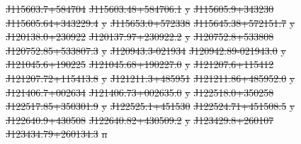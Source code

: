 \documentclass[11pt, a4paper]{book}
\providecommand{\DIFdeltex}[1]{{\protect\color{red}\sout{#1}}}                      %
\providecommand{\DIFdelFL}[1]{\DIFdel{#1}} %
\providecommand{\DIFdel}[1]{\texorpdfstring{\DIFdeltex{#1}}{}} %
\begin{document}
\DIFdelFL{J115603.7+584704 }%
\DIFdelFL{J115603.48+584706.1 }%
\DIFdelFL{y}%
\DIFdelFL{J115605.9+343230 }%
\DIFdelFL{J115605.64+343229.4 }%
\DIFdelFL{y}%
\DIFdelFL{J115653.0+572338 }%
\DIFdelFL{J115645.38+572151.7 }%
\DIFdelFL{y}%
\DIFdelFL{J120138.0+230922 }%
\DIFdelFL{J120137.97+230922.2 }%
\DIFdelFL{y}%
\DIFdelFL{J120752.8+533808 }%
\DIFdelFL{J120752.85+533807.3 }%
\DIFdelFL{y}%
\DIFdelFL{J120943.3-021934 }%
\DIFdelFL{J120942.89-021943.0 }%
\DIFdelFL{y}%
\DIFdelFL{J121045.6+190225 }%
\DIFdelFL{J121045.68+190227.0 }%
\DIFdelFL{y}%
\DIFdelFL{J121207.6+115412 }%
\DIFdelFL{J121207.72+115413.8 }%
\DIFdelFL{y}%
\DIFdelFL{J121211.3+485951 }%
\DIFdelFL{J121211.86+485952.0 }%
\DIFdelFL{y}%
\DIFdelFL{J121406.7+002634 }%
\DIFdelFL{J121406.73+002635.0 }%
\DIFdelFL{y}%
\DIFdelFL{J122518.0+350258 }%
\DIFdelFL{J122517.85+350301.9 }%
\DIFdelFL{y}%
\DIFdelFL{J122525.1+451530 }%
\DIFdelFL{J122524.71+451508.5 }%
\DIFdelFL{y}%
\DIFdelFL{J122640.9+430508 }%
\DIFdelFL{J122640.82+430509.2 }%
\DIFdelFL{y}%
\DIFdelFL{J123429.8+260107 }%
\DIFdelFL{J123434.79+260134.3 }%
\DIFdelFL{n}%
\end{document}
